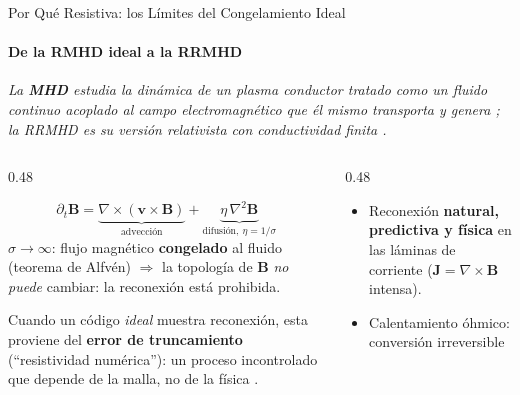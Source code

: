 \documentclass[aspectratio=169,9pt]{beamer}
\begin{document}
\begin{frame}{Por Qu\'e Resistiva: los L\'imites del Congelamiento Ideal}
\framesubtitle{De la RMHD ideal a la RRMHD}
{\scriptsize\color{INF3}\itshape La \textbf{MHD} estudia la din\'amica de un plasma
 conductor tratado como un \emph{fluido continuo} acoplado al campo electromagn\'etico
 que \'el mismo transporta y genera \citep{goedbloed-2004,rezzolla-2013};
 la RRMHD es su versi\'on relativista con conductividad finita
 \citep{palenzuela-2009,komissarov-2007}.\par}
\vspace{0.10cm}
\begin{columns}[T]
\begin{column}{0.48\textwidth}
  \begin{tcolorbox}[EQ={Inducci\'on: advecci\'on vs.\ difusi\'on}]
    \scriptsize
    \[
      \partial_t\mathbf{B}
      =\underbrace{\nabla\times(\mathbf{v}\times\mathbf{B})}_{\text{advecci\'on}}
      +\underbrace{\eta\,\nabla^2\mathbf{B}}_{\text{difusi\'on},\ \eta=1/\sigma}
    \]
    $\sigma\to\infty$: flujo magn\'etico \textbf{congelado} al fluido
    (teorema de Alfv\'en) $\Rightarrow$ la topolog\'ia de $\mathbf B$
    \emph{no puede} cambiar: la reconexi\'on est\'a prohibida.
  \end{tcolorbox}
  \pause\vspace{0.12cm}
  \begin{tcolorbox}[WRN={El problema de la MHD ideal num\'erica}]
    \scriptsize
    Cuando un c\'odigo \emph{ideal} muestra reconexi\'on, esta proviene del
    \textbf{error de truncamiento} (``resistividad num\'erica''):
    un proceso incontrolado que depende de la malla, no de la f\'isica
    \citep{komissarov-2007}.
  \end{tcolorbox}
\end{column}
\begin{column}{0.48\textwidth}
  \pause
  \begin{tcolorbox}[RES={Lo que habilita la resistividad f\'isica}]
    \scriptsize
    \begin{itemize}\setlength\itemsep{2pt}
      \item Reconexi\'on \textbf{natural, predictiva y f\'isica} en las
            l\'aminas de corriente ($\mathbf J=\nabla\times\mathbf B$ intensa).
      \item Calentamiento \'ohmico: conversi\'on irreversible

\end{itemize}
\end{tcolorbox}
\end{column}
\end{columns}
\end{frame}
\end{document}
